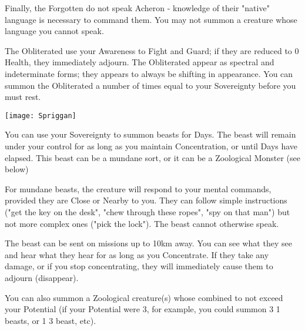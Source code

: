 {Finally, the Forgotten do not speak Acheron - knowledge of their "native" language is necessary to command them.  You may not summon a creature whose language you cannot speak.  

\cbreak


The Obliterated use your Awareness \UD to Fight and Guard; if they are reduced to 0 Health, they immediately adjourn. The Obliterated appear as spectral and indeterminate forms; they appears to always be shifting in appearance.  You can summon the Obliterated a number of times equal to your Sovereignty before you must rest.

  \begin{center}
  \texttt{[image: Spriggan]}
  \end{center}



You can use your Sovereignty to summon beasts for Days.  The beast will remain under your control for as long as you maintain Concentration, or until Days have elapsed.  This beast can be a mundane sort, or it can be a Zoological Monster (see below)

For mundane beasts, the creature will respond to your mental commands, provided they are Close or Nearby to you.  They can follow simple instructions ("get the key on the desk", "chew through these ropes", "spy on that man") but not more complex ones ("pick the lock").  The beast cannot otherwise speak. 

The beast can be sent on missions up to 10km away. You can see what they see and hear what they hear for as long as you Concentrate. If they take any damage, or if you stop concentrating, they will immediately cause them to adjourn (disappear).

You can also summon a Zoological creature(s) whose combined \HD to not exceed your Potential (if your Potential were 3, for example, you could summon 3 1 \HD beasts, or 1 3 \HD beast, etc).  


}
